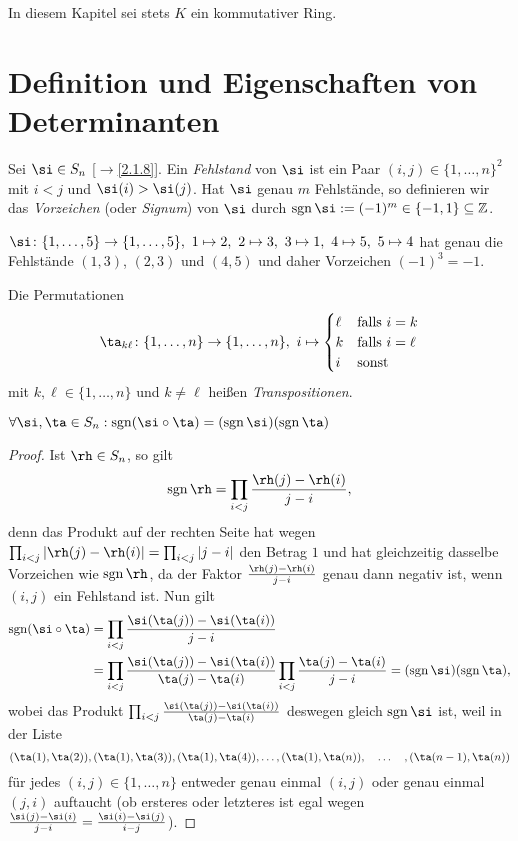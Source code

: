 \documentclass[../../main.tex]{subfiles}
\begin{document}
In diesem Kapitel sei stets $K$ ein kommutativer Ring.

\section{Definition und Eigenschaften von Determinanten}

\begin{df}\label{9.1.1}
Sei $\si\in S_n$ [$\to$\ref{2.1.8}]. Ein \emph{Fehlstand} von $\si$ ist ein Paar $(i,j)\in\{1,\dots,n\}^2$ mit $i<j$ und $\si(i)>\si(j)$. Hat $\si$ genau $m$
Fehlstände, so definieren wir das \emph{Vorzeichen} (oder \emph{Signum}) von $\si$ durch $\sgn\si:=(-1)^m\in\{-1,1\}\subseteq\Z$.
\end{df}

\begin{bsp}\label{9.1.2}
$\si\colon\{1,\dots,5\}\to\{1,\dots,5\},\ 1\mapsto2,~2\mapsto3,~3\mapsto1,~4\mapsto5,~5\mapsto4$ hat genau die Fehlstände
$(1,3)$, $(2,3)$ und $(4,5)$ und daher Vorzeichen $(-1)^3=-1$.
\end{bsp}

\begin{df}\label{9.1.3}
Die Permutationen 
$$\ta_{k\ell}\colon\{1,\dots,n\}\to\{1,\dots,n\},\ i\mapsto\begin{cases}\ell&\text{falls }i=k\\k&\text{falls }i=\ell\\i&\text{sonst}\end{cases}$$
mit $k,\ell\in\{1,\dots,n\}$ und $k\ne\ell$ heißen \emph{Transpositionen}.
\end{df}

\begin{sat}\label{9.1.4}
$\forall\si,\ta\in S_n:\sgn(\si\circ\ta)=(\sgn\si)(\sgn\ta)$
\end{sat}

\begin{proof}
Ist $\rh\in S_n$, so gilt \[\sgn\rh=\prod_{i<j}\frac{\rh(j)-\rh(i)}{j-i},\]
denn das Produkt auf der rechten Seite hat wegen $\prod_{i<j}|\rh(j)-\rh(i)|=\prod_{i<j}|j-i|$ den Betrag $1$ und hat gleichzeitig
dasselbe Vorzeichen wie $\sgn\rh$, da der Faktor $\frac{\rh(j)-\rh(i)}{j-i}$ genau dann negativ ist, wenn $(i,j)$ ein Fehlstand ist.
Nun gilt
\begin{align*}
\sgn(\si\circ\ta)&=\prod_{i<j}\frac{\si(\ta(j))-\si(\ta(i))}{j-i}\\
&=\prod_{i<j}\frac{\si(\ta(j))-\si(\ta(i))}{\ta(j)-\ta(i)}\prod_{i<j}\frac{\ta(j)-\ta(i)}{j-i}=(\sgn\si)(\sgn\ta),
\end{align*}
wobei das Produkt $\prod_{i<j}\frac{\si(\ta(j))-\si(\ta(i))}{\ta(j)-\ta(i)}$ deswegen gleich $\sgn\si$ ist, weil in der Liste
\[(\ta(1),\ta(2)),(\ta(1),\ta(3)),(\ta(1),\ta(4)),\dots,(\ta(1),\ta(n)),\quad\dots\quad,(\ta(n-1),\ta(n))\]
für jedes $(i,j)\in\{1,\dots,n\}$ entweder genau einmal $(i,j)$ oder genau einmal $(j,i)$ auftaucht (ob ersteres oder letzteres ist egal wegen
$\frac{\si(j)-\si(i)}{j-i}=\frac{\si(i)-\si(j)}{i-j}$).
\end{proof}
\end{document}
